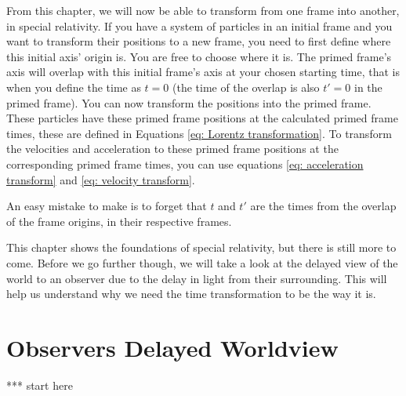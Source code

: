 From this chapter, we will now be able to transform from one frame into another, in special relativity.
If you have a system of particles in an initial frame and you want to transform their positions to a new frame, you need to first define where this initial axis' origin is.
You are free to choose where it is.
The primed frame's axis will overlap with this initial frame's axis at your chosen starting time, that is when you define the time as ${t}=0$ (the time of the overlap is also ${t{'}}=0$ in the primed frame).
You can now transform the positions into the primed frame.
These particles have these primed frame positions at the calculated primed frame times, these are defined in Equations \eqref{eq: Lorentz transformation}.
To transform the velocities and acceleration to these primed frame positions at the corresponding primed frame times, you can use equations \eqref{eq: acceleration transform} and \eqref{eq: velocity transform}.

An easy mistake to make is to forget that ${t}$ and ${t{'}}$ are the times from the overlap of the frame origins, in their respective frames.

This chapter shows the foundations of special relativity, but there is still more to come.
Before we go further though, we will take a look at the delayed view of the world to an observer due to the delay in light from their surrounding.
This will help us understand why we need the time transformation to be the way it is.



\printbibliography[segment=\therefsegment, heading=subbibliography]

\chapter{Observers Delayed Worldview} \label{ch: Observers Delayed Worldview}

*** start here

